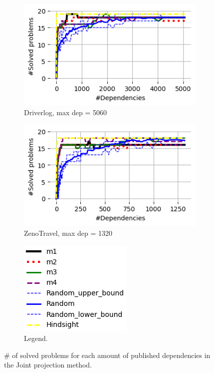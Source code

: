 \documentclass{article}
\newcommand{\commentout}[1]{}
\theoremstyle{remark}
\begin{document}
\begin{figure}[t!]
\begin{subfigure}[b]{0.3\textwidth}
  \includegraphics[width=1\linewidth]{Results_graphs/Joint_Projection/With_Random/coverage_Joint_Projection_Driverlog}
  \caption{Driverlog, max dep = 5060}
  \label{fig:Driverlog}
\end{subfigure}\hspace{1em}
\begin{subfigure}[b]{0.3\textwidth}
\centering
  \includegraphics[width=1\linewidth]{Results_graphs/Joint_Projection/With_Random/coverage_Joint_Projection_ZenoTravel}
  \caption{ZenoTravel, max dep = 1320}
  \label{fig:ZenoTravel}
\end{subfigure}\hspace{1em}
\begin{subfigure}[b]{0.5\textwidth}
\centering
  \includegraphics[scale=1]{Results_graphs/coverage_legend_with_random}
  \caption{Legend.}
  \label{fig:Legend}
\end{subfigure}\hspace{1em}
\caption{\# of solved problems for each amount of published dependencies in the Joint projection method.
\commentout{Graphs truncated after all methods solve all problems.}}
\label{fig:Coverage}
\end{figure}
\end{document}
